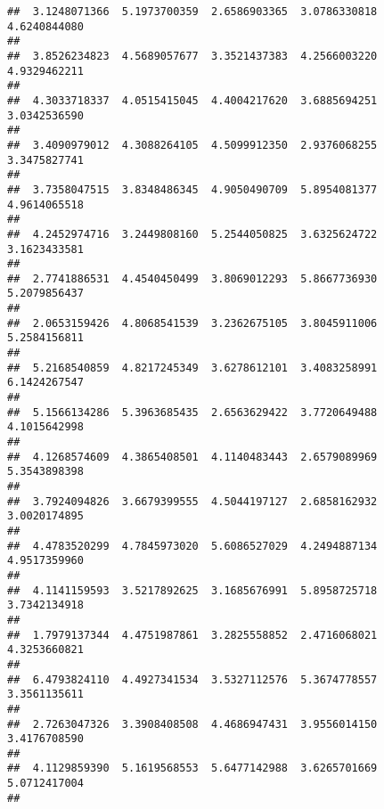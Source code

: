 \documentclass[]{article}
\begin{document}
\begin{verbatim}
##  3.1248071366  5.1973700359  2.6586903365  3.0786330818  4.6240844080 
##                                                                       
##  3.8526234823  4.5689057677  3.3521437383  4.2566003220  4.9329462211 
##                                                                       
##  4.3033718337  4.0515415045  4.4004217620  3.6885694251  3.0342536590 
##                                                                       
##  3.4090979012  4.3088264105  4.5099912350  2.9376068255  3.3475827741 
##                                                                       
##  3.7358047515  3.8348486345  4.9050490709  5.8954081377  4.9614065518 
##                                                                       
##  4.2452974716  3.2449808160  5.2544050825  3.6325624722  3.1623433581 
##                                                                       
##  2.7741886531  4.4540450499  3.8069012293  5.8667736930  5.2079856437 
##                                                                       
##  2.0653159426  4.8068541539  3.2362675105  3.8045911006  5.2584156811 
##                                                                       
##  5.2168540859  4.8217245349  3.6278612101  3.4083258991  6.1424267547 
##                                                                       
##  5.1566134286  5.3963685435  2.6563629422  3.7720649488  4.1015642998 
##                                                                       
##  4.1268574609  4.3865408501  4.1140483443  2.6579089969  5.3543898398 
##                                                                       
##  3.7924094826  3.6679399555  4.5044197127  2.6858162932  3.0020174895 
##                                                                       
##  4.4783520299  4.7845973020  5.6086527029  4.2494887134  4.9517359960 
##                                                                       
##  4.1141159593  3.5217892625  3.1685676991  5.8958725718  3.7342134918 
##                                                                       
##  1.7979137344  4.4751987861  3.2825558852  2.4716068021  4.3253660821 
##                                                                       
##  6.4793824110  4.4927341534  3.5327112576  5.3674778557  3.3561135611 
##                                                                       
##  2.7263047326  3.3908408508  4.4686947431  3.9556014150  3.4176708590 
##                                                                       
##  4.1129859390  5.1619568553  5.6477142988  3.6265701669  5.0712417004 
##                                                                       

\end{verbatim}
\end{document}
